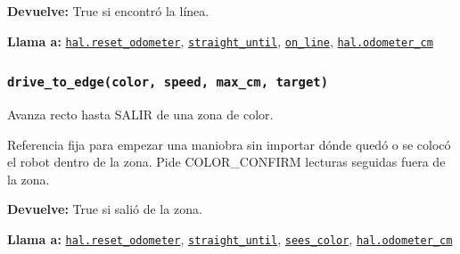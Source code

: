 \par{}\par\smallskip
\noindent\textbf{Devuelve:} True si encontró la línea.\par
\noindent\textbf{Llama a:} \hyperref[fn:hal:reset-odometer]{\texttt{hal.reset\_\allowbreak{}odometer}}, \hyperref[fn:motion:straight-until]{\texttt{straight\_\allowbreak{}until}}, \hyperref[fn:motion:on-line]{\texttt{on\_\allowbreak{}line}}, \hyperref[fn:hal:odometer-cm]{\texttt{hal.odometer\_\allowbreak{}cm}}\par

\subsubsection{\texttt{drive\_\allowbreak{}to\_\allowbreak{}edge(color, speed, max\_\allowbreak{}cm, target)}}\label{fn:motion:drive-to-edge}
\noindent Avanza recto hasta SALIR de una zona de color.

Referencia fija para empezar una maniobra sin importar dónde quedó o se colocó el robot dentro de la zona. Pide COLOR\_CONFIRM lecturas seguidas fuera de la zona.

\par{}\par\smallskip
\noindent\textbf{Devuelve:} True si salió de la zona.\par
\noindent\textbf{Llama a:} \hyperref[fn:hal:reset-odometer]{\texttt{hal.reset\_\allowbreak{}odometer}}, \hyperref[fn:motion:straight-until]{\texttt{straight\_\allowbreak{}until}}, \hyperref[fn:motion:sees-color]{\texttt{sees\_\allowbreak{}color}}, \hyperref[fn:hal:odometer-cm]{\texttt{hal.odometer\_\allowbreak{}cm}}\par

